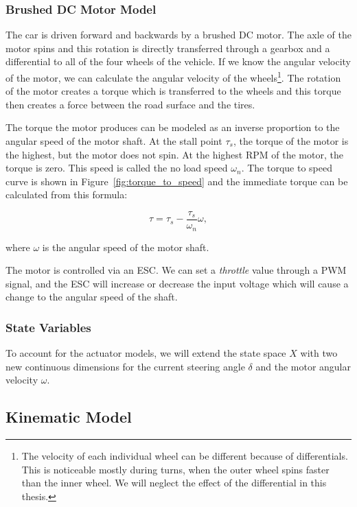 \subsubsection{Brushed DC Motor Model}

The car is driven forward and backwards by a brushed DC motor. The axle of the motor spins and this rotation is directly transferred through a gearbox and a differential to all of the four wheels of the vehicle. If we know the angular velocity of the motor, we can calculate the angular velocity of the wheels\footnote{The velocity of each individual wheel can be different because of differentials. This is noticeable mostly during turns, when the outer wheel spins faster than the inner wheel. We will neglect the effect of the differential in this thesis.}. The rotation of the motor creates a torque which is transferred to the wheels and this torque then creates a force between the road surface and the tires.

The torque the motor produces can be modeled as an inverse proportion to the angular speed of the motor shaft. At the stall point $\tau_{s}$, the torque of the motor is the highest, but the motor does not spin. At the highest \gls{RPM} of the motor, the torque is zero. This speed is called the no load speed $\omega_n$. The torque to speed curve is shown in Figure~\ref{fig:torque_to_speed} and the immediate torque can be calculated from this formula:

\begin{equation}
	\tau=\tau_s - \dfrac{\tau_s}{\omega_n}\omega,
\end{equation}

where $\omega$ is the angular speed of the motor shaft.

The motor is controlled via an \gls{ESC}. We can set a \textit{throttle} value through a \gls{PWM} signal, and the \gls*{ESC} will increase or decrease the input voltage which will cause a change to the angular speed of the shaft.


\subsubsection{State Variables}

To account for the actuator models, we will extend the state space $X$ with two new continuous dimensions for the current steering angle $\delta$ and the motor angular velocity $\omega$.

\subsection{Kinematic Model}

